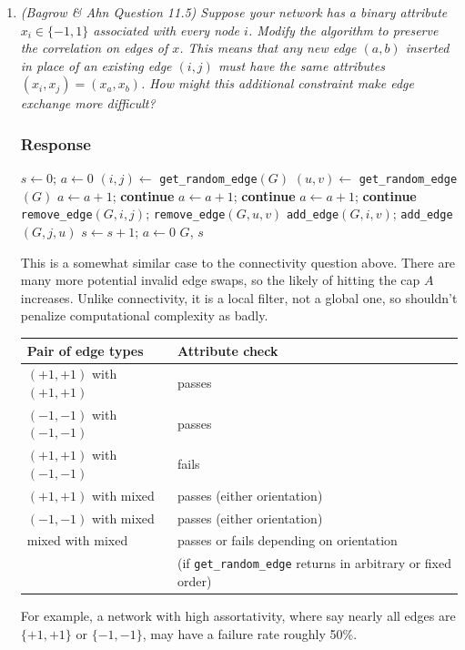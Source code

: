 \documentclass{article}
\newcommand{\response}{\subsubsection*{Response}}
\begin{document}
\begin{enumerate}[label=(\alph*)]
    \item \textit{(Bagrow \& Ahn Question 11.5) Suppose your network has a binary attribute $x_i \in \{-1, 1\}$ associated with every node $i$. Modify the algorithm to preserve the correlation on edges of $x$. This means that any new edge $(a, b)$ inserted in place of an existing edge $(i, j)$ must have the same attributes $(x_i, x_j) = (x_a, x_b)$. How might this additional constraint make edge exchange more difficult?}
\response
\begin{algorithmic}[1]
    \State $s \gets 0$; \quad $a \gets 0$
        \State $(i, j) \gets$ \texttt{get\_random\_edge}$(G)$
        \State $(u, v) \gets$ \texttt{get\_random\_edge}$(G)$
            \State $a \gets a + 1$; \textbf{continue}
        \EndIf
            \State $a \gets a + 1$; \textbf{continue}
        \EndIf
            \State $a \gets a + 1$; \textbf{continue}
        \EndIf
        \State \texttt{remove\_edge}$(G, i, j)$; \texttt{remove\_edge}$(G, u, v)$
        \State \texttt{add\_edge}$(G, i, v)$; \texttt{add\_edge}$(G, j, u)$
        \State $s \gets s + 1$; \quad $a \gets 0$
    \EndWhile
    \State \Return $G$, $s$
\EndProcedure
\end{algorithmic}
This is a somewhat similar case to the connectivity question above. There are many more potential invalid edge swaps, so the likely of hitting the cap $A$ increases. Unlike connectivity, it is a local filter, not a global one, so shouldn't penalize computational complexity as badly.

\begin{table}[h]
\centering
\begin{tabular}{ll}
\toprule
\textbf{Pair of edge types} & \textbf{Attribute check} \\
\midrule
$(+1,+1)$ with $(+1,+1)$ & passes \\
$(-1,-1)$ with $(-1,-1)$ & passes \\
$(+1,+1)$ with $(-1,-1)$ & fails \\
$(+1,+1)$ with mixed & passes (either orientation) \\
$(-1,-1)$ with mixed & passes (either orientation) \\
mixed with mixed & passes or fails depending on orientation\\ & (if \texttt{get\_random\_edge} returns in arbitrary or fixed order) \\
\bottomrule
\end{tabular}
\label{tab:attr-check}
\end{table}

For example, a network with high assortativity, where say nearly all edges are $\{+1,+1\}$ or $\{-1,-1\}$, may have a failure rate roughly 50\%.
\end{enumerate}
\clearpage
\end{document}
